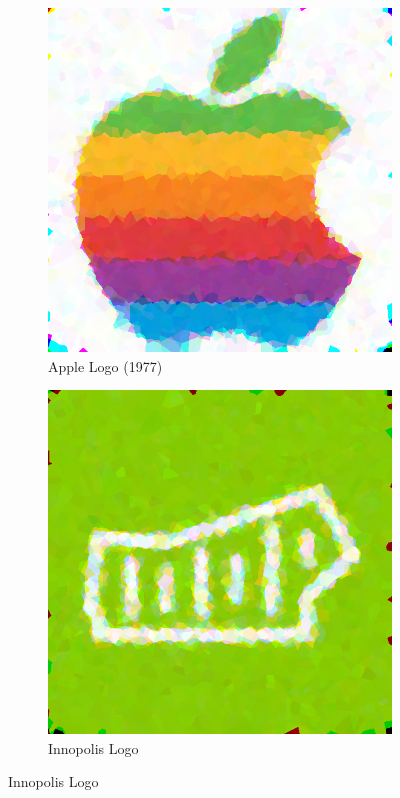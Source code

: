 \documentclass{article}
\begin{document}
\begin{figure}[ht]
   	 \centering
     \begin{subfigure}[b]{0.45\textwidth}
         \centering
         \includegraphics[width=\textwidth]{latex_src/voronoi27.png}
         \caption{Apple Logo (1977)}
     \end{subfigure}
     \hfill
     \begin{subfigure}[b]{0.45\textwidth}
         \centering
         \includegraphics[width=\textwidth]{latex_src/voronoi28.png}
         \caption{Innopolis Logo}
     \end{subfigure}
\end{figure}
\end{document}
